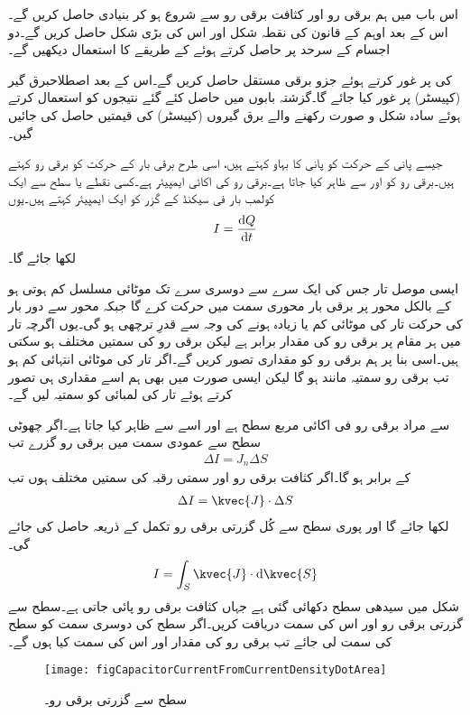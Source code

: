 اس باب میں ہم برقی رو اور کثافت برقی رو سے شروع ہو کر بنیادی   حاصل کریں گے۔اس کے بعد  اوہم کے قانون کی نقطہ شکل  اور اس کی بڑی شکل حاصل کریں گے۔دو اجسام کے سرحد پر  حاصل کرتے ہوئے  کے طریقے کا استعمال دیکھیں گے۔

  کی  پر غور کرتے ہوئے  جزو برقی مستقل حاصل کریں گے۔اس کے بعد اصطلاح{برق گیر} (کپیسٹر) پر غور کیا جائے گا۔گزشتہ بابوں میں حاصل کئے گئے نتیجوں کو استعمال کرتے ہوئے سادہ شکل و صورت رکھنے والے  برق گیروں (کپیسٹر) کی قیمتیں حاصل کی جائیں گیں۔

جیسے پانی کے حرکت کو پانی کا بہاو کہتے ہیں،  اسی طرح برقی بار کے حرکت کو برقی رو کہتے ہیں۔برقی رو کو  اور  سے ظاہر کیا جاتا ہے۔برقی رو کی اکائی ایمپیئر  ہے۔کسی نقطے یا سطح سے ایک کولمب بار فی سیکنڈ کے گزر کو ایک ایمپیئر کہتے ہیں۔یوں
\begin{align}
I=\frac{\dif Q}{\dif t}
\end{align}
لکھا جائے گا۔

ایسی موصل تار جس کی ایک سرے سے دوسری سرے تک موٹائی مسلسل کم ہوتی ہو کے بالکل محور پر برقی بار محوری سمت میں حرکت کرے گا جبکہ محور سے دور بار کی حرکت تار کی موٹائی کم یا زیادہ ہونے کی وجہ سے قدرِ ترچھی ہو گی۔یوں اگرچہ تار میں ہر مقام پر برقی رو کی مقدار برابر ہے لیکن برقی رو کی سمتیں مختلف ہو سکتی ہیں۔اسی بنا پر ہم برقی رو کو مقداری تصور کریں گے۔اگر تار کی موٹائی انتہائی کم ہو تب برقی رو سمتیہ مانند ہو گا لیکن ایسی صورت میں بھی ہم اسے مقداری ہی تصور کرتے ہوئے تار کی لمبائی کو سمتیہ لیں گے۔

 سے مراد برقی رو فی اکائی مربع سطح  ہے اور اسے  سے ظاہر کیا جاتا ہے۔اگر چھوٹی سطح  سے عمودی سمت میں  برقی رو گزرے تب
\begin{align}
\Delta I=J_n \Delta S
\end{align}
کے برابر ہو گا۔اگر کثافت برقی رو اور سمتی رقبہ کی سمتیں مختلف ہوں تب
\begin{align}
\Delta I = \kvec{J} \cdot \Delta S
\end{align}
لکھا جائے گا اور پوری سطح سے کُل گزرتی برقی رو تکمل کے ذریعہ حاصل کی جائے گی۔
\begin{align} \label{مساوات_کپیسٹر_برقی_رو_کثافت_کا_سطحی_تکمل_ہے}
I=\int_S \kvec{J} \cdot \dif \kvec{S}
\end{align}
%
شکل  میں سیدھی سطح  دکھائی گئی ہے جہاں کثافت برقی رو  پائی جاتی ہے۔سطح سے گزرتی برقی رو اور اس کی سمت دریافت کریں۔اگر سطح کی دوسری سمت کو سطح کی سمت لی جائے تب برقی رو کی مقدار اور اس کی سمت کیا ہوں گے۔
\begin{figure}
\centering
\texttt{[image: figCapacitorCurrentFromCurrentDensityDotArea]}
\caption{سطح سے گزرتی برقی رو۔}
\label{شکل_کپیسٹر_سطح_سے_گزرتی_برقی_رو}
\end{figure}

